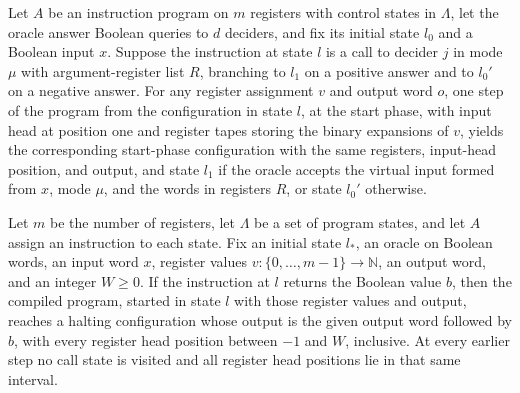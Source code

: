 \begin{lemma}
\label{Complexity.LogProg.sim_call}
\leanok
{}
Let $A$ be an instruction program on $m$ registers with control states in $\Lambda$, let
the oracle answer Boolean queries to $d$ deciders, and fix its initial state $l_0$ and a
Boolean input $x$. Suppose the instruction at state $l$ is a call to decider $j$ in mode
$\mu$ with argument-register list $R$, branching to $l_1$ on a positive answer and to
$l_0'$ on a negative answer. For any register assignment $v$ and output word $o$, one
step of the program from the configuration in state $l$, at the start phase, with input
head at position one and register tapes storing the binary expansions of $v$, yields the
corresponding start-phase configuration with the same registers, input-head position,
and output, and state $l_1$ if the oracle accepts the virtual input formed from $x$,
mode $\mu$, and the words in registers $R$, or state $l_0'$ otherwise.
\end{lemma}

\begin{lemma}
\label{Complexity.LogProg.sim_ret}
\leanok
{}
Let $m$ be the number of registers, let $\Lambda$ be a set of program states, and let
$A$ assign an instruction to each state. Fix an initial state $l_*$, an oracle on
Boolean words, an input word $x$, register values
$v\colon\{0,\ldots,m-1\}\to\mathbb{N}$, an output word, and an integer $W\ge 0$. If the
instruction at $l$ returns the Boolean value $b$, then the compiled program, started in
state $l$ with those register values and output, reaches a halting configuration whose
output is the given output word followed by $b$, with every register head position
between $-1$ and $W$, inclusive. At every earlier step no call state is visited and all
register head positions lie in that same interval.
\end{lemma}

